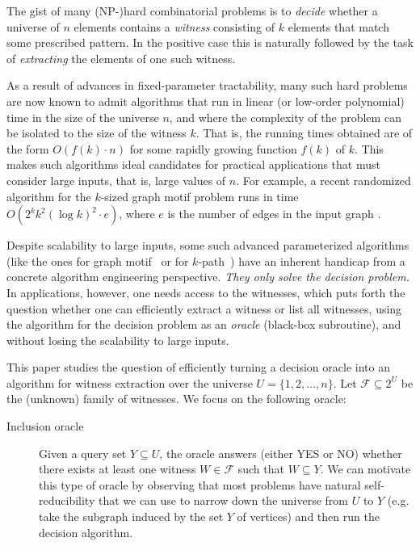 \documentclass[11pt]{article}
\begin{document}
The gist of many (NP-)hard combinatorial problems is to {\em decide} 
whether a universe of $n$ elements contains a {\em witness} consisting 
of $k$ elements that match some prescribed pattern. In the positive case 
this is naturally followed by the task of {\em extracting} the elements 
of one such witness. 

As a result of advances in fixed-parameter tractability, 
many such hard problems are now known to admit algorithms that run
in linear (or low-order polynomial) time in the size of the universe
$n$, and where the complexity of the problem can be isolated to
the size of the witness $k$. That is, the running times obtained
are of the form $O(f(k)\cdot n)$ for some rapidly growing function 
$f(k)$ of $k$. This makes such algorithms ideal candidates for 
practical applications that must consider large inputs, 
that is, large values of $n$. For example, a recent randomized 
algorithm for the $k$-sized graph motif problem runs in time 
$O(2^kk^2(\log k)^2\cdot e)$, where $e$ is the number of edges in 
the input graph \cite{BjorklundKaskiKowalik2013}. 

Despite scalability to large inputs, some such advanced parameterized 
algorithms (like the ones for graph motif~\cite{BjorklundKaskiKowalik2013} or for $k$-path~\cite{BjorklundHusfeldtKaskiKoivisto2010}) have an inherent handicap from a concrete algorithm engineering
perspective. {\em They only solve the decision problem.}
In applications, however, one needs access to the witnesses,
which puts forth the question whether one can efficiently extract a
witness or list all witnesses, using the algorithm for the decision
problem as an {\em oracle} (black-box subroutine), and without losing 
the scalability to large inputs.

This paper studies the question of efficiently turning a decision oracle 
into an algorithm for witness extraction over the 
universe $U=\{1,2,\ldots,n\}$. Let $\mathcal{F}\subseteq 2^U$ be the (unknown) family of witnesses. We focus on the following oracle:
\begin{description}
\item[Inclusion oracle]
Given a query set $Y\subseteq U$, the oracle answers (either YES or NO) 
whether there exists at least one witness $W\in\mathcal{F}$ such that 
$W\subseteq Y$. We can motivate this type of oracle by observing
that most problems have natural self-reducibility that we can use 
to narrow down the universe from $U$ to $Y$ (e.g. take the subgraph 
induced by the set $Y$ of vertices) and then run the decision algorithm.
\end{description}
\end{document}
